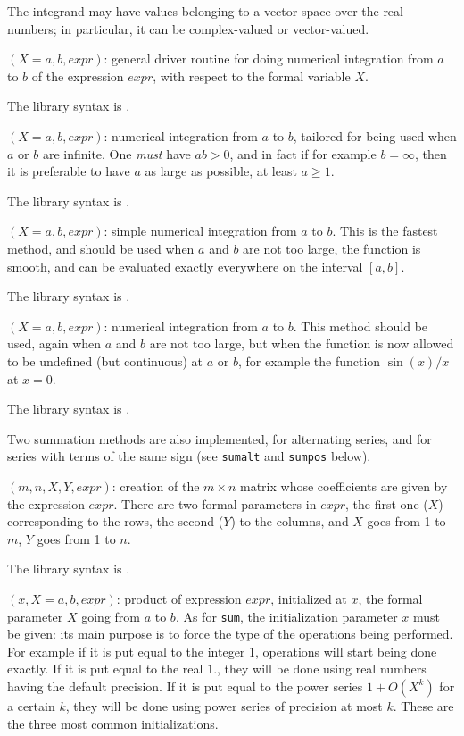 The integrand may have values belonging to a vector space over the real
numbers; in particular, it can be complex-valued or vector-valued.

$(X=a, b, expr)$: general driver routine for doing 
numerical integration from $a$ to $b$ of the expression $expr$, with respect to
the formal variable $X$.

The library syntax is .

$(X=a, b, expr)$: numerical integration from $a$ to $b$,
tailored for being used when $a$ or $b$ are infinite. One {\sl must} have 
$ab>0$, and in fact if for example $b=\infty$, then it is preferable to have 
$a$ as large as possible, at least $a\ge1$.

The library syntax is .

$(X=a,b,expr)$: simple numerical integration from $a$ to $b$.
This is the fastest method, and should be used when $a$ and $b$ are not too
large, the function is smooth, and can be evaluated exactly everywhere on the
interval $[a,b]$.

The library syntax is .

$(X=a,b,expr)$: numerical integration from $a$ to $b$. This
method should be used, again when $a$ and $b$ are not too large, but when the 
function is now allowed to be undefined (but continuous) at $a$ or $b$, for
example the function $\sin(x)/x$ at $x=0$.

The library syntax is .

Two summation methods are also implemented, for alternating series, and for
series with terms of the same sign (see {\tt sumalt} and {\tt sumpos} below).

$(m,n,X,Y,expr)$: creation of the $m\times n$ matrix
whose coefficients are given by the expression $expr$. There are two formal
parameters in $expr$, the first one ($X$) corresponding to the rows, the
second ($Y$) to the columns, and $X$ goes from 1 to $m$, $Y$ goes from 1 to
$n$.

The library syntax is .

$(x,X=a,b,expr)$: product of expression $expr$, initialized
at $x$, the formal parameter $X$ going from $a$ to $b$. As for {\tt sum}, the
initialization parameter $x$ must be given: its main purpose is to force
the type of the operations being performed. For example if it is put equal
to the integer 1, operations will start being done exactly. If it is put
equal to the real $1.$, they will be done using real numbers having the
default
precision. If it is put equal to the power series $1+O(X^k)$ for a certain
$k$, they will be done using power series of precision at most $k$. These
are the three most common initializations.

